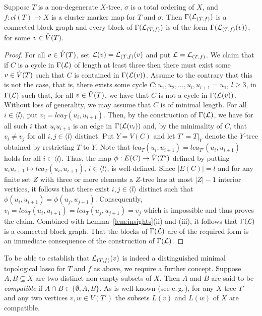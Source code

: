 \begin{pro}\label{prop:block}
Suppose $T$ is a non-degenerate $X$-tree,
 $\sigma$ is a total ordering of $X$, 
 and $f:cl(T)\to X$ is a cluster
marker map for $T$ and $\sigma$. Then  $\Gamma({\mathcal L}_{(T,f)})$
is a connected block graph and
every block of $\Gamma({\mathcal L}_{(T,f)})$ is of the form
$\Gamma({\mathcal L}_{(T,f)}(v))$, for some $v\in \mathring{V}(T)$.
\end{pro}
\begin{proof}
For all $v\in \mathring{V}(T)$, set ${\mathcal L}(v)={\mathcal L}_{(T,f)}(v)$ and
put ${\mathcal L}={\mathcal L}_{(T,f)}$.
We claim that if $C$ is a cycle in $\Gamma({\mathcal L})$ of length at least
three then there must exist some $v\in \mathring{V}(T)$ such that $C$ is
contained in $\Gamma({\mathcal L}(v))$. Assume to the contrary that this is not the
case, that is, there exists some cycle $C:u_1,u_2,\ldots, u_l,u_{l+1}=u_1$,
$l\geq 3$, in $\Gamma({\mathcal L})$ such that, for all $v\in \mathring{V}(T)$,
we have that $C$ is not a cycle in $\Gamma({\mathcal L}(v))$. Without loss of
generality, we may assume that $C$ is of minimal length. For 
all $i\in\langle l\rangle$, put $v_i=lca_T(u_i,u_{i+1})$. Then, by 
the construction
of $\Gamma({\mathcal L})$, we have for all such $i$ that $u_iu_{i+1}$ is 
an edge in $\Gamma({\mathcal L}(v_i))$ and, by the minimality of $C$,
that $v_i\not=v_j$ for all 
$i,j\in\langle l\rangle$
distinct. Put $Y=V(C)$ and let $T'=T|_Y$ denote the $Y$-tree obtained
by restricting $T$ to $Y$. Note that $lca_T(u_i,u_{i+1})=lca_{T'}(u_i,u_{i+1})$ 
holds for all $i\in\langle l\rangle$.
Thus, the  map
$\phi:E(C)\to \mathring{V}(T')$ defined by putting
 $u_iu_{i+1}\mapsto lca_{T}(u_i,u_{i+1})$,
$i\in\langle l \rangle$, is well-defined. 
Since $|E(C)|=l$ and
for any finite set $Z$ with three or more elements a $Z$-tree has
at most $|Z|-1$ interior vertices, it follows that there exist
$i,j\in \langle l \rangle$ distinct such that 
$\phi(u_i,u_{i+1})=\phi(u_j,u_{j+1})$. Consequently,
$v_i=lca_T(u_i,u_{i+1})=lca_T(u_j,u_{j+1})=v_j$
which is impossible and thus proves the claim.
Combined with Lemma~\ref{lem:insights}(ii) and (iii), 
it follows that $\Gamma({\mathcal L})$ is a
connected block graph. That the blocks of $\Gamma({\mathcal L})$ are of the
required form is an immediate consequence of the construction of
$\Gamma({\mathcal L})$.
\qquad \end{proof}


To be able to establish that ${\mathcal L}_{(T,f)}(v)$
is indeed a distinguished minimal topological lasso for $T$ and $f$
as above, we require a further concept. Suppose $A, B\subseteq X$ are
two distinct non-empty subsets of $X$. Then $A$ and $B$ are said to be
 {\em compatible} if $A\cap B\in\{\emptyset, A,B\}$. As is
 well-known (see e.\,g.\,\cite{DHKMS11,semple2003phylogenetics}), for any $X$-tree $T'$ and any
  two vertices $v,w\in V(T')$
 the subsets $L(v)$ and $L(w)$ of $X$ are 
 compatible.

